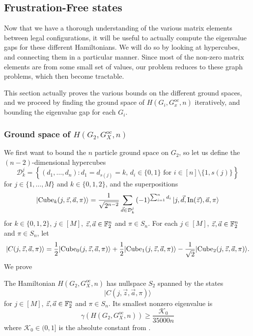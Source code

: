 \documentclass[../thesis-main/thesis-main]{subfiles}
\begin{document}
\subsection{Frustration-Free states}\label{sec:frustation_free_legal_states}

Now that we have a thorough understanding of the various matrix elements between legal configurations, it will be useful to actually compute the eigenvalue gaps for these different Hamiltonians.  We will do so by looking at hypercubes, and connecting them in a particular manner.  Since most of the non-zero matrix elements are from some small set of values, our problem reduces to these graph problems, which then become tractable. 

This section actually proves the various bounds on the different ground spaces, and we proceed by finding the ground space of $H(G_i,G_x^{\text{oc}},n)$ iteratively, and bounding the eigenvalue gap for each $G_i$.

\subsubsection{Ground space of $H(G_2,G_X^{\text{oc}},n)$}

We first want to bound the $n$ particle ground space on $G_2$, so let us define the $(n-2)$-dimensional hypercubes
\begin{equation}
  \mathcal{D}_{k}^{j}=\left\{ (d_{1},\ldots,d_{n})\colon d_{1}=d_{s(j)}=k,\, d_{i}\in\{0,1\}\text{ for }i\in[n]\setminus\{1,s(j)\}\right\} 
\end{equation}
for $j\in\{1,\ldots,M\}$ and $k\in\{0,1,2\}$, and the superpositions
\begin{equation}
|{\operatorname{Cube}_{k}(j,\vec{z},\vec{a},\pi)}\rangle=\frac{1}{\sqrt{2^{n-2}}}\sum_{\vec{d}\in\mathcal{D}_{k}^{j}}\left(-1\right)^{\sum_{i=1}^{n}d_{i}}|j,\vec{d},\operatorname{In}(\vec{z}),\vec{a},\pi\rangle
\end{equation}
for $k\in\{0,1,2\}$, $j\in[M]$, $\vec{z},\vec{a}\in\mathbb{F}_2^{n}$ and $\pi\in S_n$.  For each $j\in[M]$, $\vec{z},\vec{a}\in\mathbb{F}_2^{n}$ and $\pi\in S_n$, let
\begin{equation}
|C(j,\vec{z},\vec{a},\pi)\rangle=\frac{1}{2}|{\operatorname{Cube}_{0}(j,\vec{z},\vec{a},\pi)}\rangle+\frac{1}{2}|{\operatorname{Cube}_{1}(j,\vec{z},\vec{a},\pi)}\rangle-\frac{1}{\sqrt{2}}|{\operatorname{Cube}_{2}(j,\vec{z},\vec{a},\pi)}\rangle.\label{eq:cubestates-1}
\end{equation}
We prove

\begin{lemma}
\label{lem:beta_bound}The Hamiltonian $H(G_{2},G_X^{\text{oc}},n)$ has nullspace $S_2$ spanned by the states
\begin{equation}
|C(j,\vec{z},\vec{a},\pi)\rangle
\end{equation}
for $j\in[M]$, $\vec{z},\vec{a}\in\mathbb{F}_2^{n}$ and $\pi\in S_n$. Its smallest nonzero eigenvalue is 
\begin{equation}
  \gamma(H(G_{2},G_X^{\text{oc}},n)) \geq \frac{\mathcal{K}_0}{35000n}
\end{equation}
where $\mathcal{K}_0\in (0,1]$ is the absolute constant from .
\end{lemma}
\end{document}

